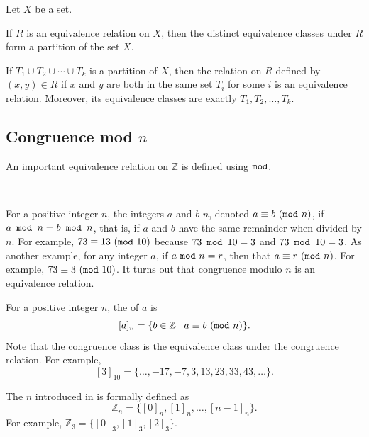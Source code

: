 \begin{rem}
\label{rem_equiv_class_partition}
    Let $X$ be a set.  
        \begin{apart}
            \item If $R$ is an equivalence relation on $X$, then the distinct equivalence classes under $R$ form a partition of the set $X$.
            \item If $T_1 \cup T_2 \cup \cdots \cup T_k$ is a partition of $X$, then the relation on $R$ defined by $(x,y) \in R$ if $x$ and $y$ are both in the same set $T_i$ for some $i$ is an equivalence relation. Moreover, its equivalence classes are exactly $T_1, T_2, \ldots, T_k$.
        \end{apart}
\end{rem}


\newcommand{\subcongmod}{Congruence mod $n$}
\subsection{\subcongmod}
\label{sub_cong_modn}

An important equivalence relation on $\mathbb{Z}$ is defined using $\texttt{mod}$. 

\begin{defn}
\label{defn_cong_modn}
~
    \begin{apart}
        \item For a positive integer $n$, the integers $a$ and $b$  $n$, denoted $a \equiv b ~(\texttt{mod} ~n)$, if $a \texttt{~mod~} n = b \texttt{~mod~} n$, that is, if $a$ and $b$ have the same remainder when divided by $n$.  For example, $73 \equiv 13 ~(\texttt{mod} ~10)$ because $73 \texttt{~mod~} 10 = 3$ and $73 \texttt{~mod~} 10 = 3$.  As another example, for any integer $a$, if $a ~\texttt{mod}~ n=r$, then  that $a \equiv r ~(\texttt{mod} ~n)$.  For example, $73 \equiv 3 ~(\texttt{mod} ~10)$.  It turns out that congruence modulo $n$ is an equivalence relation.
        
        \item For a positive integer $n$, the  of $a$ is 
            $$[a]_n = \{ b \in \mathbb{Z} \mid a \equiv b ~(\texttt{mod} ~n)\}.$$  
        Note that the congruence class is the equivalence class under the congruence relation.
        For example, 
            $$[3]_{10} = \{\ldots, -17, -7, 3, 13, 23, 33, 43, \ldots\}.$$
        \item The  $n$ introduced in  is formally defined as $$\mathbb{Z}_n = \{[0]_n, [1]_n, \ldots, [n-1]_n\}.$$  For example, $\mathbb{Z}_3 = \{[0]_3, [1]_3, [2]_3\}$.
    \end{apart}
\end{defn}

